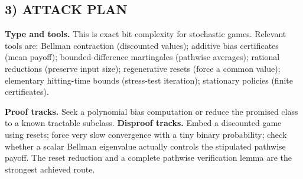 \documentclass[11pt,a4paper]{article}
\theoremstyle{definition}
\theoremstyle{remark}
\begin{document}
\subsection*{3) ATTACK PLAN}
\textbf{Type and tools.} This is exact bit complexity for stochastic games. Relevant tools are: Bellman contraction (discounted values); additive bias certificates (mean payoff); bounded-difference martingales (pathwise averages); rational reductions (preserve input size); regenerative resets (force a common value); elementary hitting-time bounds (stress-test iteration); stationary policies (finite certificates).

\textbf{Proof tracks.} Seek a polynomial bias computation or reduce the promised class to a known tractable subclass. \textbf{Disproof tracks.} Embed a discounted game using resets; force very slow convergence with a tiny binary probability; check whether a scalar Bellman eigenvalue actually controls the stipulated pathwise payoff. The reset reduction and a complete pathwise verification lemma are the strongest achieved route.
\end{document}
